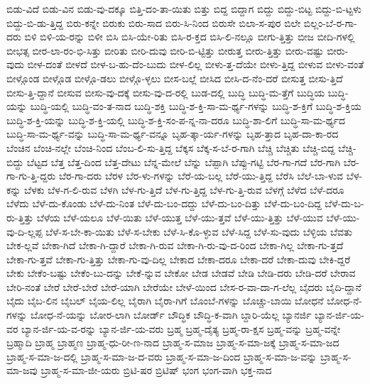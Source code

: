 {ಬಿಡು-ವಿದೆ
ಬಿಡು-ವಿನ
ಬಿಡು-ವು-ದಕ್ಕೂ
ಬಿತ್ತಿ-ದಂ-ತಾ-ಯಿತು
ಬಿತ್ತು
ಬಿದ್ದ
ಬಿದ್ದಾಗ
ಬಿದ್ದು
ಬಿದ್ದು-ಬಿಟ್ಟ
ಬಿದ್ದು-ಬಿ-ಟ್ಟಳು
ಬಿದ್ದು-ಬಿ-ಡು-ತ್ತಿದ್ದ
ಬಿರು-ಕನ್ನೇ
ಬಿರುಕು
ಬಿರು-ಸಾದ
ಬಿರು-ಸಿ-ನಿಂದ
ಬಿರುಸೇ
ಬಿಲಾ-ಸ-ಪುರ
ಬಿಲೇ
ಬಿಲ್ಲಂ-ಬೆ-ರ-ಗಾ-ದರು
ಬಿಳಿ
ಬಿಳಿ-ಯ-ರನ್ನು
ಬಿಳೀ
ಬಿಸಿ
ಬಿಸಿ-ಯೇ-ರಿತು
ಬಿಸಿ-ರ-ಕ್ತದ
ಬಿಸಿ-ಲಿ-ನಲ್ಲೂ
ಬೀಗು-ತ್ತಿತ್ತು
ಬೀಜ
ಬೀದಿ-ಗಳಲ್ಲಿ
ಬೀಭತ್ಸ
ಬೀರ-ಲಾ-ರಂ-ಭಿ-ಸಿತ್ತು
ಬೀರಿತು
ಬೀರಿ-ದುವು
ಬೀರಿ-ಬಿ-ಟ್ಟಿತ್ತು
ಬೀರುತ್ತ
ಬೀರು-ತ್ತಿತ್ತು
ಬೀರು-ವಷ್ಟು
ಬೀರು-ವುದು
ಬೀಳ-ದಂತೆ
ಬೀಳದೆ
ಬೀಳ-ಬ-ಹು-ದೆಂ-ಬುದು
ಬೀಳ-ಲಿಲ್ಲ
ಬೀಳು-ತ್ತ-ದೆಯೇ
ಬೀಳು-ತ್ತಿದ್ದ
ಬೀಳುವ
ಬೀಳು-ವಂತೆ
ಬೀಳ್ಗೊಂಡ
ಬೀಳ್ಗೊಡ
ಬೀಳ್ಗೊ-ಡಲು
ಬೀಳ್ಗೊ-ಳ್ಳಲು
ಬೀಸ-ಬಲ್ಲೆ
ಬೀಸಿದ
ಬೀಸಿ-ದ-ನೆಂ-ದರೆ
ಬೀಸುತ್ತ
ಬೀಸು-ತ್ತಿದೆ
ಬೀಸು-ತ್ತಿ-ದ್ದಾನೆ
ಬೀಸುವ
ಬೀಸು-ವು-ದಕ್ಕೆ
ಬೀಸು-ವು-ದ-ರಲ್ಲಿ
ಬುಡ-ದಲ್ಲಿ
ಬುದ್ಧಿ
ಬುದ್ಧಿ-ಮ-ತ್ತೆಗೆ
ಬುದ್ಧಿಯ
ಬುದ್ಧಿ-ಯನ್ನು
ಬುದ್ಧಿ-ಯಲ್ಲಿ
ಬುದ್ಧಿ-ವಂ-ತ-ನಾದ
ಬುದ್ಧಿ-ಶಕ್ತಿ
ಬುದ್ಧಿ-ಶ-ಕ್ತಿ-ಸಾ-ಮ-ರ್ಥ್ಯ-ಗಳನ್ನು
ಬುದ್ಧಿ-ಶ-ಕ್ತಿಗೆ
ಬುದ್ಧಿ-ಶ-ಕ್ತಿಯ
ಬುದ್ಧಿ-ಶ-ಕ್ತಿ-ಯನ್ನು
ಬುದ್ಧಿ-ಶ-ಕ್ತಿ-ಯಲ್ಲಿ
ಬುದ್ಧಿ-ಶ-ಕ್ತಿ-ಸಂ-ಪ-ನ್ನ-ನಾ-ದರೂ
ಬುದ್ಧಿ-ಶಾ-ಲಿಗೆ
ಬುದ್ಧಿ-ಸಾ-ಮ-ರ್ಥ್ಯದ
ಬುದ್ಧಿ-ಸಾ-ಮ-ರ್ಥ್ಯ-ವನ್ನು
ಬುದ್ಧಿ-ಸಾ-ಮ-ರ್ಥ್ಯ-ವನ್ನೂ
ಬೃಹ-ತ್ಕಾ-ರ್ಯ-ಗಳನ್ನು
ಬೃಹ-ತ್ತಾದ
ಬೃಹ-ದಾ-ಕಾ-ರದ
ಬೆಂಚಿನ
ಬೆಂಚಿ-ನಲ್ಲೇ
ಬೆಂಚಿ-ನಿಂದ
ಬೆಂಬ-ಲಿ-ಸು-ತ್ತಿದ್ದ
ಬೆಕ್ಕಸ
ಬೆಕ್ಕ-ಸ-ಬೆ-ರ-ಗಾಗಿ
ಬೆಚ್ಚಿ
ಬೆಚ್ಚಿತು
ಬೆಚ್ಚಿ-ಬಿದ್ದ
ಬೆಚ್ಚಿ-ಬಿದ್ದು
ಬೆಟ್ಟದ
ಬೆತ್ತ
ಬೆತ್ತ-ದಿಂದ
ಬೆತ್ತ-ದೇಟು
ಬೆನ್ನ-ಮೇಲೆ
ಬೆನ್ನು
ಬೆಪ್ಪಾಗಿ
ಬೆಪ್ಪು-ಗಟ್ಟಿ
ಬೆರ-ಗಾ-ಗದೆ
ಬೆರ-ಗಾಗಿ
ಬೆರ-ಗಾ-ಗು-ತ್ತಿ-ದ್ದರು
ಬೆರ-ಗಾ-ದರು
ಬೆರಳ
ಬೆರ-ಳು-ಗಳನ್ನು
ಬೆರೆ-ಯ-ಬಲ್ಲ
ಬೆರೆ-ಯು-ತ್ತಿದ್ದ
ಬೆರೆಸಿ
ಬೆಲೆ-ಬಾ-ಳುವ
ಬೆಳ-ಕನ್ನು
ಬೆಳಕು
ಬೆಳ-ಗ-ಲಿ-ರುವ
ಬೆಳಗಿ
ಬೆಳ-ಗು-ತ್ತಿದೆ
ಬೆಳ-ಗು-ತ್ತಿದ್ದ
ಬೆಳ-ಗು-ತ್ತಿ-ರುವ
ಬೆಳಗ್ಗೆ
ಬೆಳೆದ
ಬೆಳೆ-ದರೂ
ಬೆಳೆದು
ಬೆಳೆ-ದು-ಕೊಂಡು
ಬೆಳೆ-ದು-ನಿಂತ
ಬೆಳೆ-ದು-ಬಂ-ದದ್ದು
ಬೆಳೆ-ದು-ಬಂ-ದಿತ್ತು
ಬೆಳೆ-ದು-ಬಂ-ದಿದ್ದ
ಬೆಳೆ-ದು-ಬ-ರು-ತ್ತಿತ್ತು
ಬೆಳೆಯ
ಬೆಳೆ-ಯಲೂ
ಬೆಳೆ-ಯಿತು
ಬೆಳೆ-ಯುತ್ತ
ಬೆಳೆ-ಯು-ತ್ತವೆ
ಬೆಳೆ-ಯು-ತ್ತಿತ್ತು
ಬೆಳೆ-ಯುವ
ಬೆಳೆ-ಯು-ವು-ದಿ-ಲ್ಲಪ್ಪ
ಬೆಳೆ-ಸ-ಬೇ-ಕಾ-ಯಿತು
ಬೆಳೆ-ಸ-ಬೇಕು
ಬೆಳೆ-ಸಿ-ಕೊ-ಳ್ಳುವ
ಬೆಳೆ-ಸಿದ್ದ
ಬೆಳೆ-ಸು-ವುದು
ಬೆಳ್ಳಿಯ
ಬೆವತು
ಬೇಕ-ಲ್ಲವೆ
ಬೇಕಾ-ಗಿದೆ
ಬೇಕಾ-ಗಿ-ದ್ದಾರೆ
ಬೇಕಾ-ಗಿ-ರುವ
ಬೇಕಾ-ಗಿ-ರು-ವು-ದ-ರಿಂದ
ಬೇಕಾ-ಗಿಲ್ಲ
ಬೇಕಾ-ಗು-ತ್ತದೆ
ಬೇಕಾ-ಗು-ತ್ತವೆ
ಬೇಕಾ-ಗು-ತ್ತಿತ್ತು
ಬೇಕಾ-ಗು-ವು-ದಿಲ್ಲ
ಬೇಕಾದ
ಬೇಕಾ-ದರೂ
ಬೇಕಾ-ದರೆ
ಬೇಕಾ-ದುವು
ಬೇಕಿ-ದ್ದರೆ
ಬೇಕು
ಬೇಕೆಂ-ಬಷ್ಟು
ಬೇಕೆಂ-ಬು-ದನ್ನು
ಬೇಕೆ-ನ್ನುವ
ಬೇಕೋ
ಬೇಡ
ಬೇಡವೆ
ಬೇಡಿ
ಬೇಡಿ-ದರು
ಬೇಡಿ-ದರೆ
ಬೇರಾವ
ಬೇರಿ-ನಂತೆ
ಬೇರೆ
ಬೇರೆ-ಬೇರೆ
ಬೇರೆ-ಯಾಗಿ
ಬೇರೆಯೇ
ಬೇಳೆ-ಯಿಂದ
ಬೇಸ-ರ-ವಾ-ದಾ-ಗ-ಲೆಲ್ಲ
ಬೈದರು
ಬೈದಿ-ದ್ದಾನೆ
ಬೈದು
ಬೈಬ-ಲಿನ
ಬೈಬಲ್
ಬೈಯ-ಲಿಲ್ಲ
ಬೈರಾಗಿ
ಬೈರಾ-ಗಿಗೆ
ಬೊಂಬೆ-ಗಳನ್ನು
ಬೊಚ್ಚು-ಬಾಯಿ
ಬೋಧನೆ
ಬೋಧ-ನೆ-ಗಳನ್ನು
ಬೋಧ-ನೆ-ಯನ್ನು
ಬೋರ-ಲಾಗಿ
ಬೋರ್ಡ್
ಬೌದ್ಧಿಕ
ಬೌದ್ಧಿ-ಕ-ವಾಗಿ
ಬ್ದಾರಿ-ಯೆಲ್ಲ
ಬ್ಯಾನರ್ಜಿ
ಬ್ಯಾನ-ರ್ಜಿ-ಯ-ವರ
ಬ್ಯಾನ-ರ್ಜಿ-ಯ-ವ-ರನ್ನು
ಬ್ಯಾನ-ರ್ಜಿ-ಯ-ವರು
ಬ್ರಹ್ಮ
ಬ್ರಹ್ಮ-ದೈತ್ಯ
ಬ್ರಹ್ಮ-ರಾ-ಕ್ಷಸ
ಬ್ರಹ್ಮ-ವನ್ನು
ಬ್ರಹ್ಮ-ವನ್ನೇ
ಬ್ರಹ್ಮಾದಿ
ಬ್ರಾಹ್ಮ
ಬ್ರಾಹ್ಮಣ
ಬ್ರಾಹ್ಮ-ಧು-ರೀ-ಣ-ನಾದ
ಬ್ರಾಹ್ಮ-ಸ-ಮಾಜ
ಬ್ರಾಹ್ಮ-ಸ-ಮಾ-ಜಕ್ಕೆ
ಬ್ರಾಹ್ಮ-ಸ-ಮಾ-ಜದ
ಬ್ರಾಹ್ಮ-ಸ-ಮಾ-ಜ-ದಲ್ಲಿ
ಬ್ರಾಹ್ಮ-ಸ-ಮಾ-ಜ-ದ-ವರು
ಬ್ರಾಹ್ಮ-ಸ-ಮಾ-ಜ-ದಿಂದ
ಬ್ರಾಹ್ಮ-ಸ-ಮಾ-ಜ-ವನ್ನು
ಬ್ರಾಹ್ಮ-ಸ-ಮಾ-ಜವು
ಬ್ರಾಹ್ಮ-ಸ-ಮಾ-ಜೀ-ಯರು
ಬ್ರಿಟಿ-ಷರ
ಬ್ರಿಟಿಷ್
ಭಂಗ
ಭಂಗ-ವಾಗಿ
ಭಕ್ತ-ನಾದ
}
